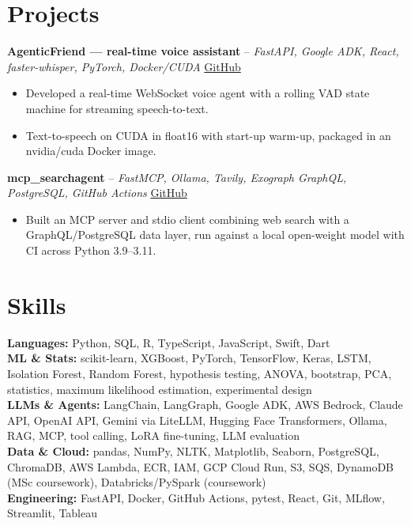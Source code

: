\documentclass[a4paper,10pt]{article}
\begin{document}
\section{Projects}
\noindent\textbf{AgenticFriend — real-time voice assistant} -- \textit{FastAPI, Google ADK, React, faster-whisper, PyTorch, Docker/CUDA} \hfill \href{https://github.com/Thiruvel-AP/adk_multi-agent}{GitHub}
\begin{itemize}
  \item Developed a real-time WebSocket voice agent with a rolling VAD state machine for streaming speech-to-text.
  \item Text-to-speech on CUDA in float16 with start-up warm-up, packaged in an nvidia/cuda Docker image.
\end{itemize}
\noindent\textbf{mcp\_searchagent} -- \textit{FastMCP, Ollama, Tavily, Exograph GraphQL, PostgreSQL, GitHub Actions} \hfill \href{https://github.com/Thiruvel-AP/mcp_searchagent}{GitHub}
\begin{itemize}
  \item Built an MCP server and stdio client combining web search with a GraphQL/PostgreSQL data layer, run against a local open-weight model with CI across Python 3.9–3.11.
\end{itemize}

\section{Skills}
\textbf{Languages:} Python, SQL, R, TypeScript, JavaScript, Swift, Dart\\
\textbf{ML \& Stats:} scikit-learn, XGBoost, PyTorch, TensorFlow, Keras, LSTM, Isolation Forest, Random Forest, hypothesis testing, ANOVA, bootstrap, PCA, statistics, maximum likelihood estimation, experimental design\\
\textbf{LLMs \& Agents:} LangChain, LangGraph, Google ADK, AWS Bedrock, Claude API, OpenAI API, Gemini via LiteLLM, Hugging Face Transformers, Ollama, RAG, MCP, tool calling, LoRA fine-tuning, LLM evaluation\\
\textbf{Data \& Cloud:} pandas, NumPy, NLTK, Matplotlib, Seaborn, PostgreSQL, ChromaDB, AWS Lambda, ECR, IAM, GCP Cloud Run, S3, SQS, DynamoDB (MSc coursework), Databricks/PySpark (coursework)\\
\textbf{Engineering:} FastAPI, Docker, GitHub Actions, pytest, React, Git, MLflow, Streamlit, Tableau
\end{document}
